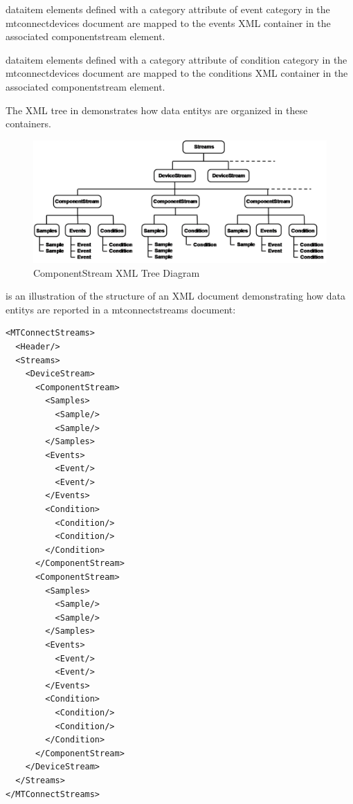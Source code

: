 \tab \gls{dataitem} elements defined with a \gls{category} attribute of \gls{event category} in the \gls{mtconnectdevices} document are mapped to the \gls{events} XML container in the associated \gls{componentstream} element.

\tab \gls{dataitem} elements defined with a \gls{category} attribute of \gls{condition category} in the \gls{mtconnectdevices} document are mapped to the \gls{conditions} XML container in the associated \gls{componentstream} element.

The XML tree in  demonstrates how \glspl{data entity} are organized in these containers.  

\begin{figure}[ht]
  \centering
  \includegraphics[width=1.0\textwidth]{figures/componentstream-xml-tree-diagram.png}
  \caption{ComponentStream XML Tree Diagram}
  \label{fig:componentstream-xml-tree-diagram}
\end{figure}
\FloatBarrier

 is an illustration of the structure of an XML document demonstrating how \glspl{data entity} are reported in a \gls{mtconnectstreams} document:

\newpage

\begin{lstlisting}[firstnumber=1,escapechar=|,%
    caption={Example of  MTConnectStreams},label={lst:example-of-mtconnectstreams}]
<MTConnectStreams>
  <Header/>
  <Streams>
    <DeviceStream>
      <ComponentStream>
        <Samples>
          <Sample/>
          <Sample/>
        </Samples>
        <Events>
          <Event/>
          <Event/>
        </Events>
        <Condition>
          <Condition/>
          <Condition/>
        </Condition>
      </ComponentStream>
      <ComponentStream>
        <Samples>
          <Sample/>
          <Sample/>
        </Samples>
        <Events>
          <Event/>
          <Event/>
        </Events>
        <Condition>
          <Condition/>
          <Condition/>
        </Condition>
      </ComponentStream>
    </DeviceStream>
  </Streams>
</MTConnectStreams>
\end{lstlisting}

